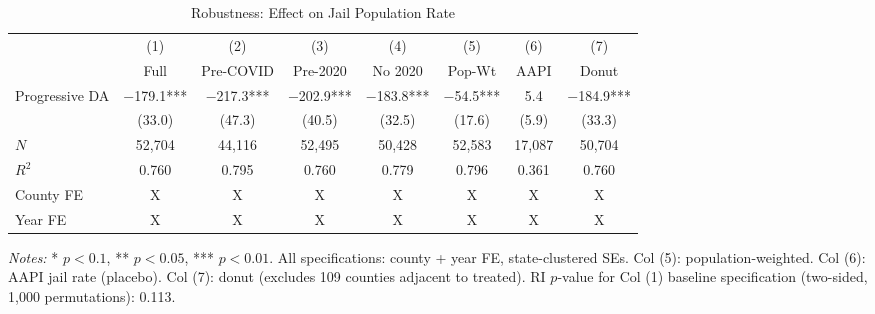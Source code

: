 \begin{table}[ht]
\centering
\footnotesize
\caption{Robustness: Effect on Jail Population Rate}
\label{tab:robustness}
\begin{tabular}{@{}l@{\hskip 6pt}c@{\hskip 6pt}c@{\hskip 6pt}c@{\hskip 6pt}c@{\hskip 6pt}c@{\hskip 6pt}c@{\hskip 6pt}c@{}}
\toprule
 & (1) & (2) & (3) & (4) & (5) & (6) & (7) \\
 & Full & Pre-COVID & Pre-2020 & No 2020 & Pop-Wt & AAPI & Donut \\
\midrule
Progressive DA & $-$179.1*** & $-$217.3*** & $-$202.9*** & $-$183.8*** & $-$54.5*** & 5.4 & $-$184.9*** \\
 & (33.0) & (47.3) & (40.5) & (32.5) & (17.6) & (5.9) & (33.3) \\
\midrule
$N$ & 52,704 & 44,116 & 52,495 & 50,428 & 52,583 & 17,087 & 50,704 \\
$R^2$ & 0.760 & 0.795 & 0.760 & 0.779 & 0.796 & 0.361 & 0.760 \\
County FE & X & X & X & X & X & X & X \\
Year FE & X & X & X & X & X & X & X \\
\bottomrule
\end{tabular}
\begin{minipage}{\textwidth}
\vspace{0.5em}
\footnotesize \textit{Notes:} * $p < 0.1$, ** $p < 0.05$, *** $p < 0.01$. All specifications: county + year FE, state-clustered SEs. Col (5): population-weighted. Col (6): AAPI jail rate (placebo). Col (7): donut (excludes 109 counties adjacent to treated). RI $p$-value for Col (1) baseline specification (two-sided, 1,000 permutations): 0.113.
\end{minipage}
\end{table}
